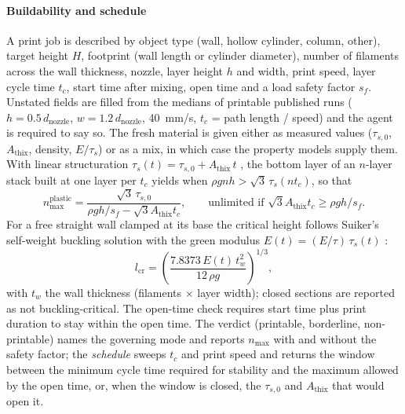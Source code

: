 \documentclass[preprint,12pt]{elsarticle}
\begin{document}
\paragraph{Buildability and schedule} A print job is described by object type (wall, hollow cylinder, column, other), target height $H$, footprint (wall length or cylinder diameter), number of filaments across the wall thickness, nozzle, layer height $h$ and width, print speed, layer cycle time $t_c$, start time after mixing, open time and a load safety factor $s_f$. Unstated fields are filled from the medians of printable published runs ($h = 0.5\,d_{\mathrm{nozzle}}$, $w = 1.2\,d_{\mathrm{nozzle}}$, 40~mm/s, $t_c$ = path length / speed) and the agent is required to say so. The fresh material is given either as measured values ($\tau_{s,0}$, $A_{\mathrm{thix}}$, density, $E/\tau_s$) or as a mix, in which case the property models supply them. With linear structuration $\tau_s(t) = \tau_{s,0} + A_{\mathrm{thix}}\, t$ \cite{perrot2016structural,roussel2018rheological}, the bottom layer of an $n$-layer stack built at one layer per $t_c$ yields when $\rho g n h > \sqrt{3}\,\tau_s(n t_c)$, so that
\begin{equation}
n_{\max}^{\mathrm{plastic}} = \frac{\sqrt{3}\,\tau_{s,0}}{\rho g h / s_f - \sqrt{3} A_{\mathrm{thix}} t_c},
\qquad \text{unlimited if } \sqrt{3} A_{\mathrm{thix}} t_c \ge \rho g h / s_f .
\label{eq:plastic}
\end{equation}
For a free straight wall clamped at its base the critical height follows Suiker's self-weight buckling solution with the green modulus $E(t) = (E/\tau)\,\tau_s(t)$ \cite{suiker2018mechanical}:
\begin{equation}
l_{\mathrm{cr}} = \left( \frac{7.8373\, E(t)\, t_w^2}{12\, \rho g} \right)^{1/3},
\label{eq:buckling}
\end{equation}
with $t_w$ the wall thickness (filaments $\times$ layer width); closed sections are reported as not buckling-critical. The open-time check requires start time plus print duration to stay within the open time. The verdict (printable, borderline, non-printable) names the governing mode and reports $n_{\max}$ with and without the safety factor; the \emph{schedule} sweeps $t_c$ and print speed and returns the window between the minimum cycle time required for stability and the maximum allowed by the open time, or, when the window is closed, the $\tau_{s,0}$ and $A_{\mathrm{thix}}$ that would open it.
\end{document}

